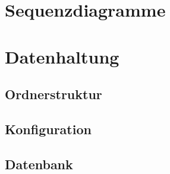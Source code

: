 \documentclass[a4paper]{scrreprt}
\begin{document}
   \chapter{Sequenzdiagramme}

    \chapter{Datenhaltung}
        \section{Ordnerstruktur}
        \section{Konfiguration}
        \section{Datenbank}
\end{document}
